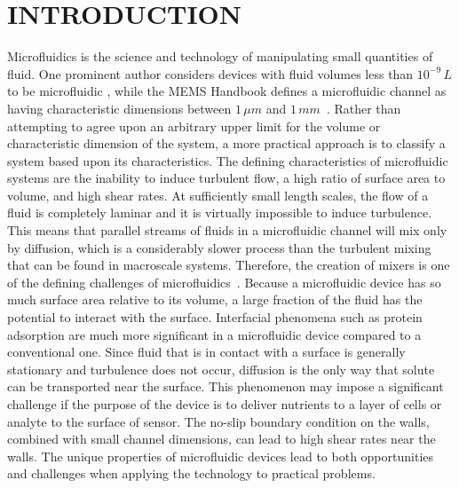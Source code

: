 
\chapter{\texorpdfstring{INTRODUCTION}{CHAPTER . INTRODUCTION}}

Microfluidics is the science and technology of manipulating small
quantities of fluid. One prominent author considers devices with fluid
volumes less than $10^{-9}\, L$ to be microfluidic \cite{Whitesides2006},
while the MEMS Handbook defines a microfluidic channel as having characteristic
dimensions between $1\,\mu m$ and $1\, mm$~\cite{Sharp2002}. Rather
than attempting to agree upon an arbitrary upper limit for the volume
or characteristic dimension of the system, a more practical approach
is to classify a system based upon its characteristics. The defining
characteristics of microfluidic systems are the inability to induce
turbulent flow, a high ratio of surface area to volume, and high shear
rates. At sufficiently small length scales, the flow of a fluid is
completely laminar and it is virtually impossible to induce turbulence.
This means that parallel streams of fluids in a microfluidic channel
will mix only by diffusion, which is a considerably slower process
than the turbulent mixing that can be found in macroscale systems.
Therefore, the creation of mixers is one of the defining challenges
of microfluidics~\cite{Nguyen2005}. Because a microfluidic device
has so much surface area relative to its volume, a large fraction
of the fluid has the potential to interact with the surface. Interfacial
phenomena such as protein adsorption are much more significant in
a microfluidic device compared to a conventional one. Since fluid
that is in contact with a surface is generally stationary and turbulence
does not occur, diffusion is the only way that solute can be transported
near the surface. This phenomenon may impose a significant challenge
if the purpose of the device is to deliver nutrients to a layer of
cells or analyte to the surface of sensor. The no-slip boundary condition
on the walls, combined with small channel dimensions, can lead to
high shear rates near the walls. The unique properties of microfluidic
devices lead to both opportunities and challenges when applying the
technology to practical problems.

